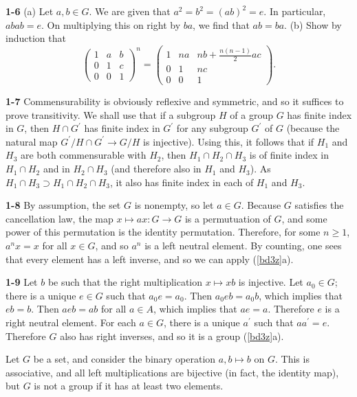 \documentclass[a4paper,11pt,final]{memoir}%
\theoremstyle{nonumberplain}
\begin{document}
\bigskip\noindent\textbf{1-6}
(a) Let $a,b\in G$. We are given that $a^{2}=b^{2}=(ab)^{2}=e$. In particular,
$abab=e$. On multiplying this on right by $ba$, we find that $ab=ba$. (b) Show
by induction that
\[%
\begin{pmatrix}
1 & a & b\\
0 & 1 & c\\
0 & 0 & 1
\end{pmatrix}
^{n}=%
\begin{pmatrix}
1 & na & nb+\frac{n(n-1)}{2}ac\\
0 & 1 & nc\\
0 & 0 & 1
\end{pmatrix}
.
\]

\bigskip\noindent\textbf{1-7}
Commensurability is obviously reflexive and symmetric, and so it suffices to
prove transitivity. We shall use that if a subgroup $H$ of a group $G$ has
finite index in $G$, then $H\cap G^{\prime}$ has finite index in $G^{\prime}$
for any subgroup $G^{\prime}$ of $G$ (because the natural map $G^{\prime
}/H\cap G^{\prime}\rightarrow G/H$ is injective). Using this, it follows that
if $H_{1}$ and $H_{3}$ are both commensurable with $H_{2}$, then $H_{1}\cap
H_{2}\cap H_{3}$ is of finite index in $H_{1}\cap H_{2}$ and in $H_{2}\cap
H_{3}$ (and therefore also in $H_{1}$ and $H_{3}$). As $H_{1}\cap H_{3}\supset
H_{1}\cap H_{2}\cap H_{3}$, it also has finite index in each of $H_{1}$ and
$H_{3}$.

\bigskip\noindent\textbf{1-8}
By assumption, the set $G$ is nonempty, so let $a\in G$. Because $G$ satisfies
the cancellation law, the map $x\mapsto ax\colon G\rightarrow G$ is a
permutuation of $G$, and some power of this permutation is the identity
permutation. Therefore, for some $n\geq1$, $a^{n}x=x$ for all $x\in G$, and so
$a^{n}$ is a left neutral element. By counting, one sees that every element
has a left inverse, and so we can apply (\ref{bd3z}a).

\bigskip\noindent\textbf{1-9}
Let $b$ be such that the right multiplication $x\mapsto xb$ is injective. Let
$a_{0}\in G$;  there is a unique $e\in G$ such that $a_{0}e=a_{0}$. Then
$a_{0}eb=a_{0}b$, which implies that $eb=b$. Then $aeb=ab$ for all $a\in A$,
which implies that $ae=a$. Therefore $e$ is a right neutral element.  For each
$a\in G$, there is a unique $a^{\prime}$ such that $aa^{\prime}=e$.
Therefore $G$ also has right inverses, and so it is a group (\ref{bd3z}a).\par
Let $G$ be a set, and consider the binary operation $a,b\mapsto b$ on $G$.
This is associative, and all left multiplications are bijective (in fact, the
identity map), but $G$ is not a group if it has at least two elements.
\end{document}
